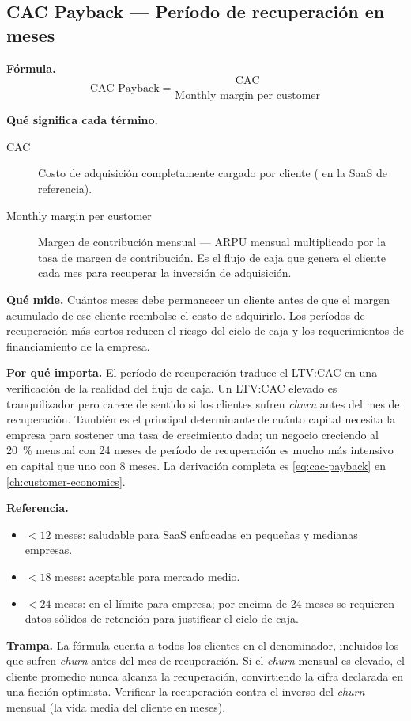 \subsection{CAC Payback --- Período de recuperación en meses}

\textbf{Fórmula.}
\[
  \text{CAC Payback} = \frac{\mathrm{CAC}}{\text{Monthly margin per customer}}
\]

\textbf{Qué significa cada término.}
\begin{description}
  \item[CAC] Costo de adquisición completamente cargado por cliente ( en la SaaS
    de referencia).
  \item[Monthly margin per customer] Margen de contribución mensual --- ARPU mensual
    multiplicado por la tasa de margen de contribución. Es el flujo de caja que genera el
    cliente cada mes para recuperar la inversión de adquisición.
\end{description}

\textbf{Qué mide.} Cuántos meses debe permanecer un cliente antes de que el margen
acumulado de ese cliente reembolse el costo de adquirirlo. Los períodos de recuperación más
cortos reducen el riesgo del ciclo de caja y los requerimientos de financiamiento de la
empresa.

\textbf{Por qué importa.} El período de recuperación traduce el LTV:CAC en una verificación
de la realidad del flujo de caja. Un LTV:CAC elevado es tranquilizador pero carece de
sentido si los clientes sufren \emph{churn} antes del mes de recuperación. También es el
principal determinante de cuánto capital necesita la empresa para sostener una tasa de
crecimiento dada; un negocio creciendo al \qty{20}{\percent} mensual con 24 meses de
período de recuperación es mucho más intensivo en capital que uno con 8 meses. La derivación
completa es \cref{eq:cac-payback} en \cref{ch:customer-economics}.

\textbf{Referencia.}
\begin{itemize}
  \item $< 12$ meses: saludable para SaaS enfocadas en pequeñas y medianas empresas.
  \item $< 18$ meses: aceptable para mercado medio.
  \item $< 24$ meses: en el límite para empresa; por encima de 24 meses se requieren datos
    sólidos de retención para justificar el ciclo de caja.
\end{itemize}

\textbf{Trampa.} La fórmula cuenta a todos los clientes en el denominador, incluidos los que
sufren \emph{churn} antes del mes de recuperación. Si el \emph{churn} mensual es elevado, el
cliente promedio nunca alcanza la recuperación, convirtiendo la cifra declarada en una ficción
optimista. Verificar la recuperación contra el inverso del \emph{churn} mensual (la vida
media del cliente en meses).

